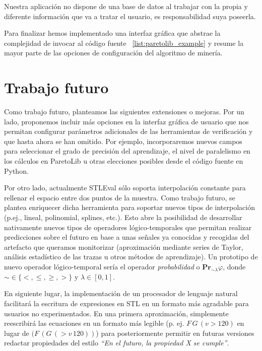 Nuestra aplicación no dispone de una base de datos al trabajar con la propia y diferente información que va a tratar el usuario, es responsabilidad suya poseerla.

Para finalizar hemos implementado una interfaz gráfica que abstrae la complejidad de invocar al código fuente ~\ref{list:paretolib_example} y resume la mayor parte de las opciones de configuración del algoritmo de minería.


\section{Trabajo futuro}

Como trabajo futuro, planteamos las siguientes extensiones o mejoras. Por un lado, proponemos incluir más opciones en la interfaz gráfica de usuario que nos permitan configurar parámetros adicionales de las herramientas de verificación y que hasta ahora se han omitido. Por ejemplo, incorporaremos nuevos campos para seleccionar el grado de precisión del aprendizaje, el nivel de paralelismo en los cálculos en ParetoLib u otras elecciones posibles desde el código fuente en Python.


Por otro lado, actualmente STLEval sólo soporta interpolación constante para rellenar el espacio entre dos puntos de la muestra. Como trabajo futuro, se plantea enriquecer dicha herramienta para soportar nuevos tipos de interpolación (p.ej., lineal, polinomial, splines, etc.). Esto abre la posibilidad de desarrollar nativamente nuevos tipos de operadores lógico-temporales que permitan realizar predicciones sobre el futuro en base a unas señales ya conocidas y recogidas del artefacto que queramos monitorizar (aproximación mediante series de Taylor, análisis estadístico de las trazas u otros métodos de aprendizaje). Un prototipo de nuevo operador lógico-temporal sería el operador \textit{probabilidad} o $\mathbf{Pr}_{\sim \lambda}\varphi$, donde $\sim \in \{<, \leq, \geq, >\}$ y $\lambda \in [0, 1]$.

En siguiente lugar, la implementación de un procesador de lenguaje natural facilitará la escritura de expresiones en STL en un formato más agradable para usuarios no experimentados. En una primera aproximación, simplemente reescribirá las ecuaciones en un formato más legible (p. ej. $F\, G\, (v > 120)$ en lugar de $(F \, (G \, ( > v \, 120))$) para posteriormente permitir en futuras versiones redactar propiedades del estilo \textit{``En el futuro, la propiedad X se cumple''}.


